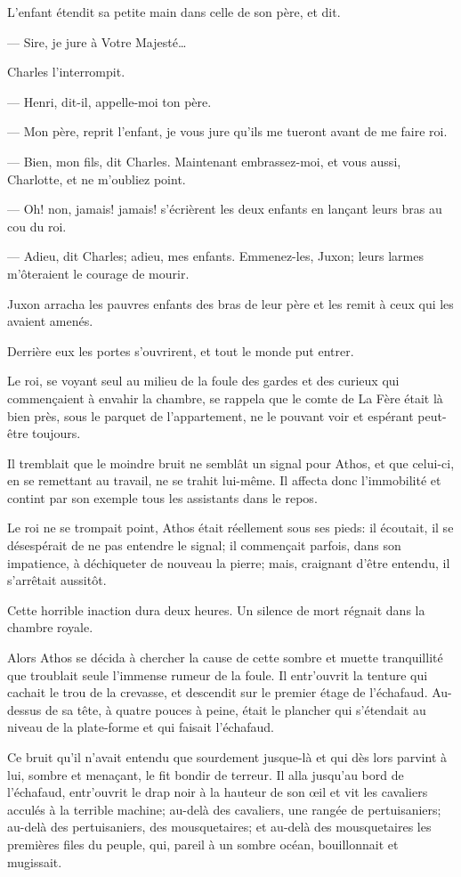 L'enfant étendit sa petite main dans celle de son père, et dit.

— Sire, je jure à Votre Majesté\dots

Charles l'interrompit.

— Henri, dit-il, appelle-moi ton père.

— Mon père, reprit l'enfant, je vous jure qu'ils me tueront avant de me faire roi.

— Bien, mon fils, dit Charles. Maintenant embrassez-moi, et vous aussi, Charlotte, et ne m'oubliez point.

— Oh! non, jamais! jamais! s'écrièrent les deux enfants en lançant leurs bras au cou du roi.

— Adieu, dit Charles; adieu, mes enfants. Emmenez-les, Juxon; leurs larmes m'ôteraient le courage de mourir.

Juxon arracha les pauvres enfants des bras de leur père et les remit à ceux qui les avaient amenés.

Derrière eux les portes s'ouvrirent, et tout le monde put entrer.

Le roi, se voyant seul au milieu de la foule des gardes et des curieux qui commençaient à envahir la chambre, se rappela que le comte de La Fère était là bien près, sous le parquet de l'appartement, ne le pouvant voir et espérant peut-être toujours.

Il tremblait que le moindre bruit ne semblât un signal pour Athos, et que celui-ci, en se remettant au travail, ne se trahit lui-même. Il affecta donc l'immobilité et contint par son exemple tous les assistants dans le repos.

Le roi ne se trompait point, Athos était réellement sous ses pieds: il écoutait, il se désespérait de ne pas entendre le signal; il commençait parfois, dans son impatience, à déchiqueter de nouveau la pierre; mais, craignant d'être entendu, il s'arrêtait aussitôt.

Cette horrible inaction dura deux heures. Un silence de mort régnait dans la chambre royale.

Alors Athos se décida à chercher la cause de cette sombre et muette tranquillité que troublait seule l'immense rumeur de la foule. Il entr'ouvrit la tenture qui cachait le trou de la crevasse, et descendit sur le premier étage de l'échafaud. Au-dessus de sa tête, à quatre pouces à peine, était le plancher qui s'étendait au niveau de la plate-forme et qui faisait l'échafaud.

Ce bruit qu'il n'avait entendu que sourdement jusque-là et qui dès lors parvint à lui, sombre et menaçant, le fit bondir de terreur. Il alla jusqu'au bord de l'échafaud, entr'ouvrit le drap noir à la hauteur de son œil et vit les cavaliers acculés à la terrible machine; au-delà des cavaliers, une rangée de pertuisaniers; au-delà des pertuisaniers, des mousquetaires; et au-delà des mousquetaires les premières files du peuple, qui, pareil à un sombre océan, bouillonnait et mugissait.


